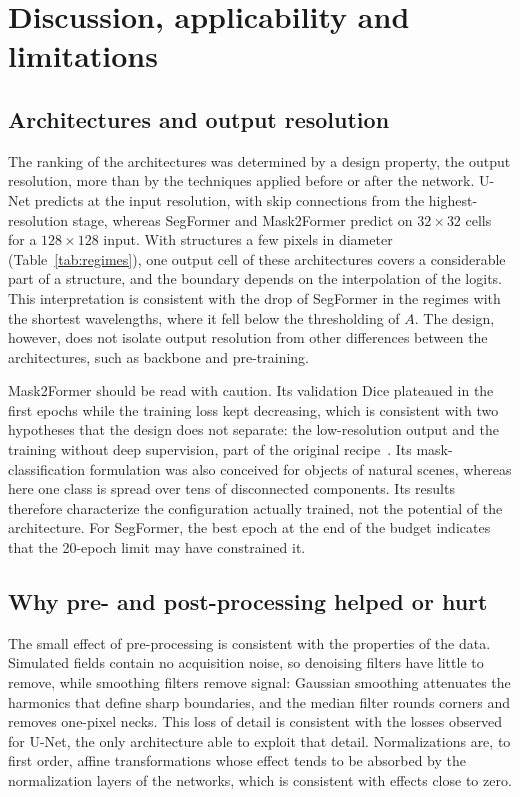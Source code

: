 \documentclass[final,5p,times,twocolumn]{elsarticle}
\begin{document}
\section{Discussion, applicability and limitations}\label{sec:sec6}

\subsection{Architectures and output resolution}\label{subsec:disc_arch}

The ranking of the architectures was determined by a design property, the output resolution, more than by the techniques applied before or after the network. U-Net predicts at the input resolution, with skip connections from the highest-resolution stage, whereas SegFormer and Mask2Former predict on $32\times32$ cells for a $128\times128$ input. With structures a few pixels in diameter (Table~\ref{tab:regimes}), one output cell of these architectures covers a considerable part of a structure, and the boundary depends on the interpolation of the logits. This interpretation is consistent with the drop of SegFormer in the regimes with the shortest wavelengths, where it fell below the thresholding of $A$. The design, however, does not isolate output resolution from other differences between the architectures, such as backbone and pre-training.

Mask2Former should be read with caution. Its validation Dice plateaued in the first epochs while the training loss kept decreasing, which is consistent with two hypotheses that the design does not separate: the low-resolution output and the training without deep supervision, part of the original recipe~\cite{cheng2022mask2former}. Its mask-classification formulation was also conceived for objects of natural scenes, whereas here one class is spread over tens of disconnected components. Its results therefore characterize the configuration actually trained, not the potential of the architecture. For SegFormer, the best epoch at the end of the budget indicates that the 20-epoch limit may have constrained it.

\subsection{Why pre- and post-processing helped or hurt}\label{subsec:disc_why}

The small effect of pre-processing is consistent with the properties of the data. Simulated fields contain no acquisition noise, so denoising filters have little to remove, while smoothing filters remove signal: Gaussian smoothing attenuates the harmonics that define sharp boundaries, and the median filter rounds corners and removes one-pixel necks. This loss of detail is consistent with the losses observed for U-Net, the only architecture able to exploit that detail. Normalizations are, to first order, affine transformations whose effect tends to be absorbed by the normalization layers of the networks, which is consistent with effects close to zero.
\end{document}

